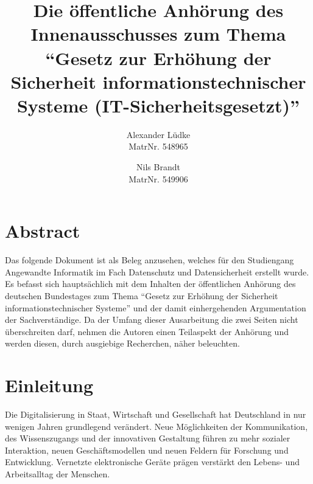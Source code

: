 \documentclass[a4paper,letterpaper,twocolumn,9,5pt,ngerman]{article}
\begin{document}
%
%

\date{}

\title{\Large \bf Die öffentliche Anhörung des Innenausschusses zum Thema "`Gesetz zur Erhöhung der Sicherheit informationstechnischer Systeme (IT-Sicherheitsgesetzt)"'}

\author{
{\rm Alexander Lüdke}\\
MatrNr. 548965
\and %
{\rm Nils Brandt}\\
MatrNr. 549906
}

\maketitle

\thispagestyle{empty}

%
%

\section*{Abstract}
\label{sec:Abstract}
Das folgende Dokument ist als Beleg anzusehen, welches für den Studiengang Angewandte Informatik im Fach Datenschutz und Datensicherheit erstellt wurde. Es befasst sich hauptsächlich mit dem Inhalten der öffentlichen Anhörung des deutschen Bundestages zum Thema "`Gesetz zur Erhöhung der Sicherheit informationstechnischer Systeme"'  und der damit einhergehenden Argumentation der Sachverständige. Da der Umfang dieser Ausarbeitung die zwei Seiten nicht überschreiten darf, nehmen die Autoren einen Teilaspekt der Anhörung und werden diesen, durch ausgiebige Recherchen, näher beleuchten. 

\section{Einleitung}
\label{sec:Einleitung} 
Die Digitalisierung in Staat, Wirtschaft und Gesellschaft hat Deutschland in nur wenigen Jahren grundlegend verändert. Neue Möglichkeiten der Kommunikation, des Wissenszugangs und der innovativen Gestaltung führen zu mehr sozialer Interaktion, neuen Geschäftsmodellen und neuen Feldern für Forschung und Entwicklung. Vernetzte elektronische Geräte prägen verstärkt den Lebens- und Arbeitsalltag der Menschen.
\end{document}
